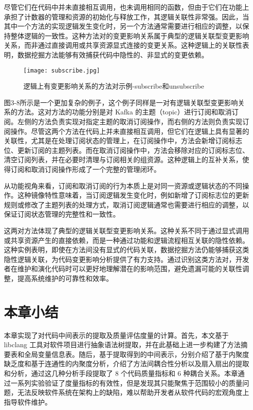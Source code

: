 尽管它们在代码中并未直接相互调用，也未调用相同的函数，但由于它们在功能上承担了计数器的管理和资源的初始化与释放工作，其逻辑关联性非常强。因此，当其中一个方法的实现逻辑发生变化时，另一个方法通常需要进行相应的调整，以保持整体逻辑的一致性。这种方法对的变更影响关系属于典型的逻辑关联型变更影响关系，而非通过直接调用或共享资源显式连接的变更关系。这种逻辑上的关联性表明，数据挖掘方法能够有效捕获代码中隐性的、非显式的变更依赖。

\begin{figure}[h]
\centering
\texttt{[image: subscribe.jpg]}
\caption{逻辑上有变更影响关系的方法对示例-subscribe和unsubscribe}
\end{figure}

图3-8所示是一个更加复杂的例子，这个例子同样是一对有逻辑关联型变更影响关系的方法。这对方法的功能分别是对 Kafka 的主题（topic）进行订阅和取消订阅。左侧的方法负责实现对指定主题的取消订阅操作，而右侧的方法则负责实现订阅操作。尽管这两个方法在代码上并未直接相互调用，但它们在逻辑上具有显著的关联性，尤其是在处理订阅状态的管理上，在订阅操作中，方法会新增订阅标志位、更新订阅的主题列表。而在取消订阅操作中，方法会移除对应的订阅标志位、清空订阅列表，并在必要时清理与订阅相关的组资源。这种逻辑上的互补关系，使得订阅和取消订阅操作形成了一个完整的管理闭环。

从功能视角来看，订阅和取消订阅的行为本质上是对同一资源或逻辑状态的不同操作。这种镜像特性意味着，当订阅逻辑发生变化时，例如新增了订阅标志位的更新规则或修改了主题列表的处理方式，取消订阅逻辑通常也需要进行相应的调整，以保证订阅状态管理的完整性和一致性。

这两对方法体现了典型的逻辑关联型变更影响关系。这种关系不同于通过显式调用或共享资源产生的直接依赖，而是一种通过功能和逻辑流程相互关联的隐性依赖。这种实例表明，即使在方法间没有显式的代码关联，数据挖掘方法仍能够捕获这类隐性逻辑关联，为代码变更影响分析提供了有力支持。通过识别这类方法对，开发者在维护和演化代码时可以更好地理解潜在的影响范围，避免遗漏可能的关联性调整，提高系统维护的可靠性和效率。







\section{本章小结}

本章实现了对代码中间表示的提取及质量评估度量的计算。首先，本文基于 libclang 工具对软件项目进行抽象语法树提取，并在此基础上进一步构建了方法摘要表和全局变量信息表。随后，基于提取得到的中间表示，分别介绍了基于内聚度缺乏度和基于连通性的内聚度分析，介绍了方法间耦合性分析以及扇入扇出的提取和分析，通过这几种分析手段提取了 8 个代码质量指标和 6 种耦合关系。本章通过一系列实验验证了度量指标的有效性，但是发现其只能聚焦于范围较小的质量问题，无法反映软件系统在架构上的缺陷，难以帮助开发者从软件代码的宏观角度上指导软件维护。

